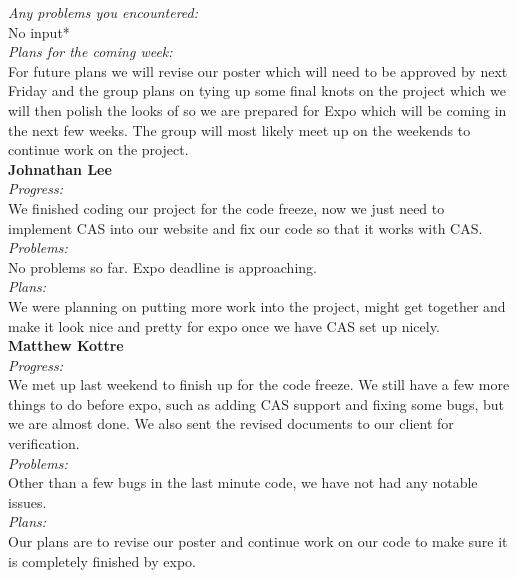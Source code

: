 \noindent\textit{Any problems you encountered:}\\
\noindent *No input*\\

\noindent\textit{Plans for the coming week:}\\
\noindent For future plans we will revise our poster which will need to be approved by next Friday and the group plans on tying up some final knots on the project which we will then polish the looks of so we are prepared for Expo which will be coming in the next few weeks. The group will most likely meet up on the weekends to continue work on the project.\\

\noindent\textbf{Johnathan Lee}\\
\noindent\textit{Progress:}\\
We finished coding our project for the code freeze, now we just need to implement CAS into our website and fix our code so that it works with CAS. \\ 

\noindent\textit{Problems:}\\
\noindent No problems so far. Expo deadline is approaching.\\

\noindent\textit{Plans:}\\
\noindent We were planning on putting more work into the project, might get together and make it look nice and pretty for expo once we have CAS set up nicely.\\

\noindent\textbf{Matthew Kottre}\\
\noindent\textit{Progress:}\\
We met up last weekend to finish up for the code freeze. We still have a few more things to do before expo, such as adding CAS support and fixing some bugs, but we are almost done. We also sent the revised documents to our client for verification.\\

\noindent\textit{Problems:}\\
\noindent Other than a few bugs in the last minute code, we have not had any notable issues.\\

\noindent\textit{Plans:}\\
\noindent Our plans are to revise our poster and continue work on our code to make sure it is completely finished by expo.\\

